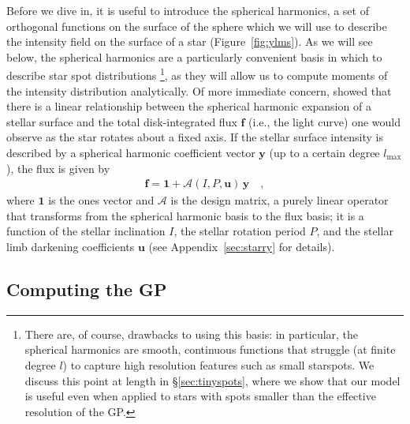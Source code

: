 \documentclass[modern]{aastex62}
\begin{document}
Before we dive in, it is useful to introduce the spherical harmonics,
a set of orthogonal functions on the surface of the sphere which we will use
to describe the intensity field on the surface of a star
(Figure~\ref{fig:ylms}). As we will see below,
the spherical harmonics are a particularly convenient basis in which to
describe star spot distributions%
\footnote{There are, of course, drawbacks to using this basis:
    in particular, the spherical harmonics are smooth, continuous functions that
    struggle (at finite degree $l$) to capture high resolution features such as
    small starspots. We discuss this point at length in \S\ref{sec:tinyspots},
    where we show that our model is useful even when applied to stars with spots
    smaller than the effective resolution of the GP.}, as they will allow us to compute
moments of the intensity distribution analytically. Of more immediate concern,
\citet{Luger2019} showed that there is a linear relationship between the
spherical harmonic expansion of a stellar surface and the total disk-integrated
flux $\mathbf{f}$ (i.e., the light curve)
one would observe as the star rotates about a fixed axis.
If the stellar surface intensity is described by a spherical harmonic
coefficient vector $\mathbf{y}$ (up to a certain degree $l_\mathrm{max}$),
the flux is given by
%
\begin{align}
    \label{eq:fAy}
    \mathbf{f} = \mathbf{1} + \pmb{\mathcal{A}}(I, P, \mathbf{u}) \, \mathbf{y}
    \quad,
\end{align}
%
where $\mathbf{1}$ is the ones vector and
$\pmb{\mathcal{A}}$ is the \starry
design matrix, a purely linear operator that transforms from the spherical
harmonic basis to the flux basis; it is
a function of the stellar inclination $I$, the stellar
rotation period $P$, and the stellar limb darkening coefficients $\mathbf{u}$
(see Appendix~\ref{sec:starry} for details).

\subsection{Computing the GP}
\label{sec:gp}
%
\end{document}
